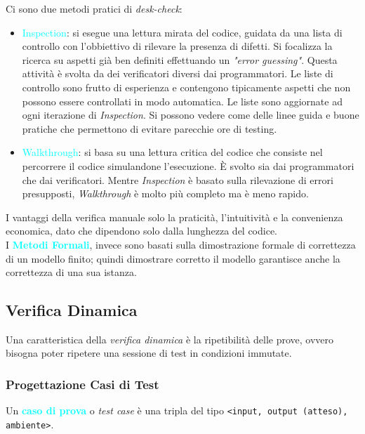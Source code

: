 Ci sono due metodi pratici di \emph{desk-check}:
\begin{itemize}
    \item \textcolor{cyan}{Inspection}: si esegue una lettura mirata del codice,
        guidata da una lista di controllo con l'obbiettivo di rilevare la presenza di
        difetti. Si focalizza la ricerca su aspetti già ben definiti effettuando
        un \emph{"error guessing"}. Questa attività è svolta da dei verificatori diversi
        dai programmatori. Le liste di controllo sono frutto di esperienza e contengono
        tipicamente aspetti che non possono essere controllati in modo automatica. Le liste
        sono aggiornate ad ogni iterazione di \emph{Inspection}. Si possono vedere come delle
        linee guida e buone pratiche che permettono di evitare parecchie ore di testing.
    \item \textcolor{cyan}{Walkthrough}: si basa su una lettura critica del codice che consiste
        nel percorrere il codice simulandone l'esecuzione. È svolto sia dai programmatori che dai
        verificatori. Mentre \emph{Inspection} è basato sulla rilevazione di errori presupposti,
        \emph{Walkthrough} è molto più completo ma è meno rapido.
\end{itemize}

I vantaggi della verifica manuale solo la praticità, l'intuitività e la
convenienza economica, dato che dipendono solo dalla lunghezza del codice. \\

I \textbf{\textcolor{cyan}{Metodi Formali}}, invece sono basati
sulla dimostrazione formale di correttezza di un modello finito; quindi
dimostrare corretto il modello garantisce anche la correttezza di una sua istanza.

\subsection{Verifica Dinamica}

Una caratteristica della \emph{verifica dinamica} è la ripetibilità delle prove, ovvero
bisogna poter ripetere una sessione di test in condizioni immutate.

\subsubsection{Progettazione Casi di Test}

Un \textbf{\textcolor{cyan}{caso di prova}} o \emph{test case} è una tripla
del tipo \verb|<input, output (atteso), ambiente>|.

